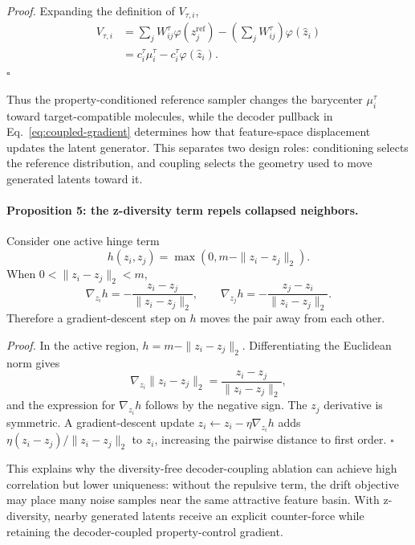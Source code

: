 \documentclass[letterpaper]{article}
\begin{document}
\emph{Proof.}
Expanding the definition of $V_{\tau,i}$,
\begin{align}
V_{\tau,i}
&=\sum_j W_{ij}^\tau\varphi(z_j^{\mathrm{ref}})
-\left(\sum_j W_{ij}^\tau\right)\varphi(\hat z_i) \nonumber\\
&=c_i^\tau\mu_i^\tau-c_i^\tau\varphi(\hat z_i).
\end{align}
\hfill $\square$

Thus the property-conditioned reference sampler changes the barycenter
$\mu_i^\tau$ toward target-compatible molecules, while the decoder pullback in
Eq.~\eqref{eq:coupled-gradient} determines how that feature-space displacement
updates the latent generator.  This separates two design roles: conditioning
selects the reference distribution, and coupling selects the geometry used to
move generated latents toward it.

\paragraph{Proposition 5: the z-diversity term repels collapsed neighbors.}
Consider one active hinge term
\begin{equation}
    h(z_i,z_j)=\max(0,m-\|z_i-z_j\|_2).
\end{equation}
When $0<\|z_i-z_j\|_2<m$,
\begin{equation}
    \nabla_{z_i} h =
    -\frac{z_i-z_j}{\|z_i-z_j\|_2},
    \qquad
    \nabla_{z_j} h =
    -\frac{z_j-z_i}{\|z_i-z_j\|_2}.
\end{equation}
Therefore a gradient-descent step on $h$ moves the pair away from each other.

\emph{Proof.}
In the active region, $h=m-\|z_i-z_j\|_2$.  Differentiating the Euclidean norm
gives
\begin{equation}
    \nabla_{z_i}\|z_i-z_j\|_2 =
    \frac{z_i-z_j}{\|z_i-z_j\|_2},
\end{equation}
and the expression for $\nabla_{z_i}h$ follows by the negative sign.  The
$z_j$ derivative is symmetric.  A gradient-descent update
$z_i\leftarrow z_i-\eta\nabla_{z_i}h$ adds
$\eta(z_i-z_j)/\|z_i-z_j\|_2$ to $z_i$, increasing the pairwise distance to
first order. \hfill $\square$

This explains why the diversity-free decoder-coupling ablation can achieve high correlation but
lower uniqueness:
without the repulsive term, the drift objective may place many noise samples
near the same attractive feature basin.  With z-diversity, nearby generated
latents receive an explicit counter-force while retaining the decoder-coupled
property-control gradient.
\end{document}

